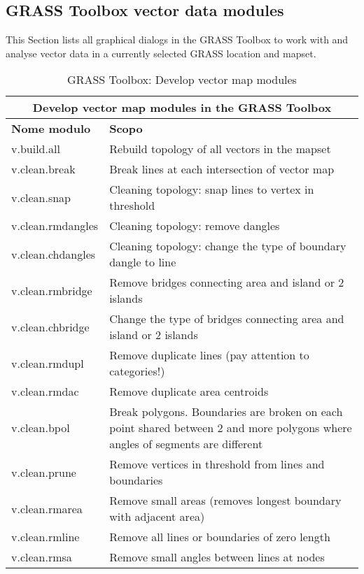 \clearpage

\subsection{GRASS Toolbox vector data modules}

This Section lists all graphical dialogs in the GRASS Toolbox to work with
and analyse vector data in a currently selected GRASS location and mapset.

\begin{table}[ht]
\centering
\caption{GRASS Toolbox: Develop vector map modules}\medskip
 \begin{tabular}{|p{4cm}|p{12cm}|}
  \hline \multicolumn{2}{|c|}{\textbf{Develop vector map modules in the GRASS
  Toolbox}} \\
  \hline \textbf{Nome modulo} & \textbf{Scopo} \\
  \hline v.build.all & Rebuild topology of all vectors in the mapset \\
  \hline v.clean.break & Break lines at each intersection of vector map \\
  \hline v.clean.snap & Cleaning topology: snap lines to vertex in threshold \\
  \hline v.clean.rmdangles & Cleaning topology: remove dangles \\
  \hline v.clean.chdangles & Cleaning topology: change the type of boundary
  dangle to line \\
  \hline v.clean.rmbridge & Remove bridges connecting area and island or 2
  islands \\
  \hline v.clean.chbridge & Change the type of bridges connecting area and
  island or 2 islands \\
  \hline v.clean.rmdupl & Remove duplicate lines (pay attention to
  categories!) \\
  \hline v.clean.rmdac & Remove duplicate area centroids \\
  \hline v.clean.bpol & Break polygons. Boundaries are broken on each
  point shared between 2 and more polygons where angles of segments are
  different \\
  \hline v.clean.prune & Remove vertices in threshold from lines and
  boundaries \\
  \hline v.clean.rmarea & Remove small areas (removes longest boundary with
  adjacent area) \\
  \hline v.clean.rmline & Remove all lines or boundaries of zero length \\
  \hline v.clean.rmsa & Remove small angles between lines at nodes \\

\end{tabular}
\end{table}
